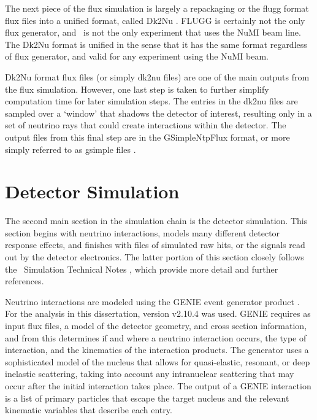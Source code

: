 The next piece of the flux simulation is largely a repackaging or the flugg format flux files into a unified format, called Dk2Nu \cite{ref:Dk2Nu}. FLUGG is certainly not the only flux generator, and \nova~is not the only experiment that uses the NuMI beam line. The Dk2Nu format is unified in the sense that it has the same format regardless of flux generator, and valid for any experiment using the NuMI beam.

Dk2Nu format flux files (or simply dk2nu files) are one of the main outputs from the flux simulation. However, one last step is taken to further simplify computation time for later simulation steps. The entries in the dk2nu files are sampled over a `window' that shadows the detector of interest, resulting only in a set of neutrino rays that could create interactions within the detector. The output files from this final step are in the GSimpleNtpFlux format, or more simply referred to as gsimple files \cite{ref:gsimple}.

\section{Detector Simulation}
\label{sec:SimDet}

The second main section in the simulation chain is the detector simulation. This section begins with neutrino interactions, models many different detector response effects, and finishes with files of simulated raw hits, or the signals read out by the detector electronics. The latter portion of this section closely follows the \nova~Simulation Technical Notes \cite{ref:TNDetSimFA, ref:TNDetSimSA}, which provide more detail and further references.


Neutrino interactions are modeled using the GENIE event generator product \cite{ref:GENIEGen, ref:GENIE}. For the analysis in this dissertation, version v2.10.4 was used. GENIE requires as input flux files, a model of the detector geometry, and cross section information, and from this determines if and where a neutrino interaction occurs, the type of interaction, and the kinematics of the interaction products. The generator uses a sophisticated model of the nucleus that allows for quasi-elastic, resonant, or deep inelastic scattering, taking into account any intranuclear scattering that may occur after the initial interaction takes place. The output of a GENIE interaction is a list of primary particles that escape the target nucleus and the relevant kinematic variables that describe each entry.

